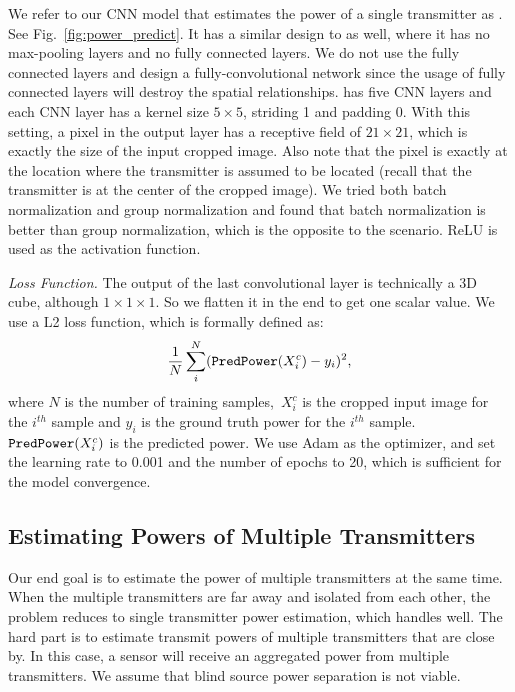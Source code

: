 We refer to our CNN model that estimates the power of a single transmitter as \power.
See Fig.~\ref{fig:power_predict}.
It has a similar design to \imgimg as well, where it has no max-pooling layers and no fully connected layers.
We do not use the fully connected layers and design a fully-convolutional network since the usage of fully connected layers will destroy the spatial relationships.
\power has five CNN layers and each CNN layer has a kernel size $5\times5$, striding 1 and padding 0.
With this setting, a pixel in the output layer has a receptive field of $21\times 21$, which is exactly the size of the input cropped image. Also note that the pixel is exactly at the location where the transmitter is assumed to be located (recall that the transmitter is at the center of the cropped image).
We tried both batch normalization and group normalization and found that batch normalization is better than group normalization, which is the opposite to the \imgimg scenario.
ReLU is used as the activation function.

{\em Loss Function.} The output of the last convolutional layer is technically a 3D cube, although $1 \times 1 \times 1$. So we flatten it in the end to get one scalar value.
We use a L2 loss function, which is formally defined as:
\begin{equation}
 \frac{1}{N} \sum_{i}^{N} ({\texttt{PredPower}}(X^c_{i}) - y_i)^2,
\end{equation}
where $N$ is the number of training samples,~$X^c_{i}$ is the cropped input image for the $i^{th}$ sample and $y_i$ is the ground truth power for the $i^{th}$ sample.
${\texttt{PredPower}}(X^c_{i})$ is the predicted power.
We use Adam as the optimizer, and set the learning rate to 0.001 and the number of epochs to 20, which is sufficient for the model convergence.

\subsection{ \bf Estimating Powers of Multiple Transmitters}
Our end goal is to estimate the power of multiple transmitters at the same time. 
When the multiple transmitters are far away and isolated from each other, the problem reduces to single transmitter power estimation, which \power handles well.
The hard part is to estimate transmit powers of multiple transmitters that are close by. 
In this case, a sensor will receive an aggregated power from multiple transmitters. We assume that blind source power separation is not viable. 

